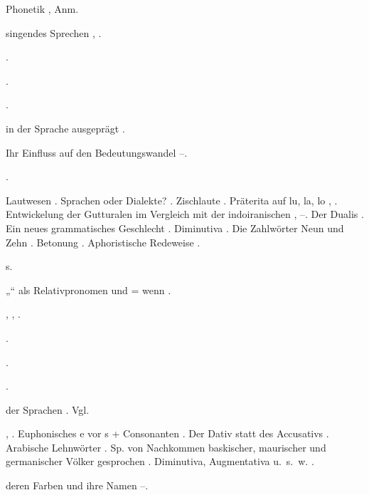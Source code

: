 \begin{register}
 Phonetik \pageref{sp.38}, Anm.

 singendes Sprechen \pageref{sp.33}, \pageref{sp.34}.

 \pageref{sp.157}.

 \pageref{sp.314}.

 \pageref{sp.101}.

 in der Sprache ausgeprägt \pageref{sp.413}.

 Ihr Einfluss auf den Bedeutungswandel \pageref{sp.245}–\pageref{sp.250}.


 \pageref{sp.45}.

 Lautwesen \pageref{sp.34}. Sprachen oder Dialekte? \pageref{sp.54}. Zischlaute \pageref{sp.148}. Präterita auf lu, la, lo \pageref{sp.159}, \pageref{sp.384}. Entwickelung der Gutturalen im Vergleich mit der indoiranischen \pageref{sp.159}, \pageref{sp.164}–\pageref{sp.165}. Der Dualis \pageref{sp.254}. Ein neues grammatisches Geschlecht \pageref{sp.254}. Diminutiva \pageref{sp.277}.  Die Zahlwörter Neun und Zehn \pageref{sp.402}. Betonung \pageref{sp.431}. Aphoristische Redeweise \pageref{sp.465}.

 s. 

„“ als Relativpronomen und = wenn \pageref{sp.100}.


 \pageref{sp.160}, \pageref{sp.282}, \pageref{sp.307}.

 \pageref{sp.186}.

 \pageref{sp.282}.

 \pageref{sp.282}.

 der Sprachen \pageref{sp.138}. Vgl. 

 \pageref{sp.8}, \pageref{sp.54}. Euphonisches e vor s + Consonanten \pageref{sp.157}. Der Dativ statt des Accusativs \pageref{sp.255}. Arabische Lehnwörter \pageref{sp.266}. Sp. von Nachkommen baskischer, maurischer und germanischer Völker gesprochen \pageref{sp.293}. Diminutiva, Augmentativa u.~s.~w. \pageref{sp.445}.

 deren Farben und ihre Namen \pageref{sp.233}–\pageref{sp.234}.


\end{register}

